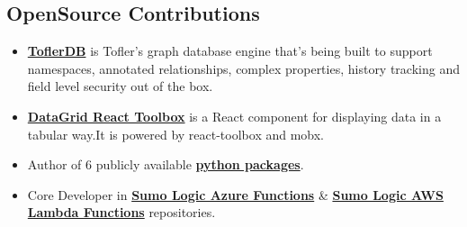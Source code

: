 \documentclass[margin,line]{resume}
\begin{document}
\begin{resume}
\section{\mysidestyle OpenSource Contributions}
\vspace{0mm}
    \begin{itemize}
                \item \href{https://github.com/tofler/toflerdb}{\textbf{ToflerDB}} is Tofler's graph database engine that's being built to support namespaces, annotated relationships, complex properties, history tracking and field level security out of the box.
                \item \href{https://github.com/tofler/datagrid-react-toolbox}{\textbf{DataGrid React Toolbox}} is a React component for displaying data in a tabular way.It is powered by react-toolbox and mobx.
                \item
                Author of 6 publicly available \href{https://pypi.org/user/himanshu_pal/}{\textbf{python packages}}.
                \item 
                Core Developer in \href{https://github.com/SumoLogic/sumologic-azure-function}{\textbf{Sumo Logic Azure Functions}} \& \href{https://github.com/SumoLogic/sumologic-aws-lambda}{\textbf{Sumo Logic AWS Lambda Functions}} repositories.

    \end{itemize}


\end{resume}
\end{document}
